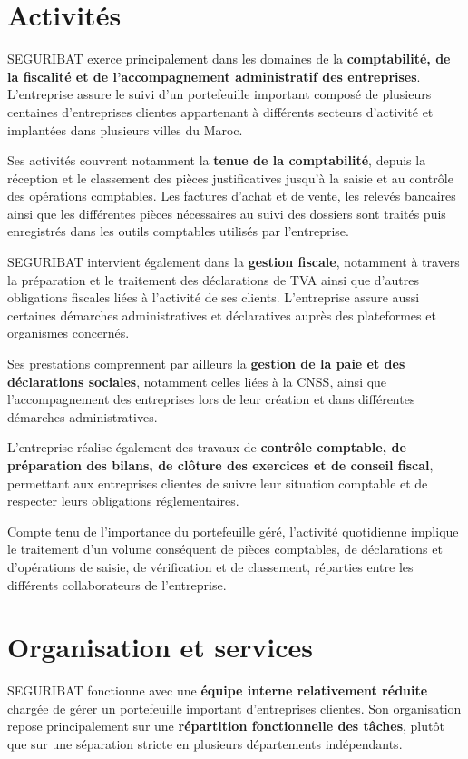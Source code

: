 \documentclass[12pt,a4paper,oneside]{report}
\begin{document}
\section{Activités}

SEGURIBAT exerce principalement dans les domaines de la \textbf{comptabilité, de la fiscalité et de l'accompagnement administratif des entreprises}. L'entreprise assure le suivi d'un portefeuille important composé de plusieurs centaines d'entreprises clientes appartenant à différents secteurs d'activité et implantées dans plusieurs villes du Maroc.

Ses activités couvrent notamment la \textbf{tenue de la comptabilité}, depuis la réception et le classement des pièces justificatives jusqu'à la saisie et au contrôle des opérations comptables. Les factures d'achat et de vente, les relevés bancaires ainsi que les différentes pièces nécessaires au suivi des dossiers sont traités puis enregistrés dans les outils comptables utilisés par l'entreprise.

SEGURIBAT intervient également dans la \textbf{gestion fiscale}, notamment à travers la préparation et le traitement des déclarations de TVA ainsi que d'autres obligations fiscales liées à l'activité de ses clients. L'entreprise assure aussi certaines démarches administratives et déclaratives auprès des plateformes et organismes concernés.

Ses prestations comprennent par ailleurs la \textbf{gestion de la paie et des déclarations sociales}, notamment celles liées à la CNSS, ainsi que l'accompagnement des entreprises lors de leur création et dans différentes démarches administratives.

L'entreprise réalise également des travaux de \textbf{contrôle comptable, de préparation des bilans, de clôture des exercices et de conseil fiscal}, permettant aux entreprises clientes de suivre leur situation comptable et de respecter leurs obligations réglementaires.

Compte tenu de l'importance du portefeuille géré, l'activité quotidienne implique le traitement d'un volume conséquent de pièces comptables, de déclarations et d'opérations de saisie, de vérification et de classement, réparties entre les différents collaborateurs de l'entreprise.

\section{Organisation et services}

SEGURIBAT fonctionne avec une \textbf{équipe interne relativement réduite} chargée de gérer un portefeuille important d'entreprises clientes. Son organisation repose principalement sur une \textbf{répartition fonctionnelle des tâches}, plutôt que sur une séparation stricte en plusieurs départements indépendants.
\end{document}
